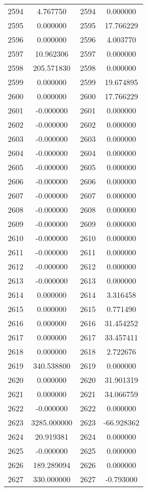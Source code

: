 \documentclass[12pt]{article}
\begin{document}
\begin{longtable}{@{}cccc@{}}
2594 & 4.767750 & 2594 & 0.000000 \\
2595 & 0.000000 & 2595 & 17.766229 \\
2596 & 0.000000 & 2596 & 4.003770 \\
2597 & 10.962306 & 2597 & 0.000000 \\
2598 & 205.571830 & 2598 & 0.000000 \\
2599 & 0.000000 & 2599 & 19.674895 \\
2600 & 0.000000 & 2600 & 17.766229 \\
2601 & -0.000000 & 2601 & 0.000000 \\
2602 & -0.000000 & 2602 & 0.000000 \\
2603 & -0.000000 & 2603 & 0.000000 \\
2604 & -0.000000 & 2604 & 0.000000 \\
2605 & -0.000000 & 2605 & 0.000000 \\
2606 & -0.000000 & 2606 & 0.000000 \\
2607 & -0.000000 & 2607 & 0.000000 \\
2608 & -0.000000 & 2608 & 0.000000 \\
2609 & -0.000000 & 2609 & 0.000000 \\
2610 & -0.000000 & 2610 & 0.000000 \\
2611 & -0.000000 & 2611 & 0.000000 \\
2612 & -0.000000 & 2612 & 0.000000 \\
2613 & -0.000000 & 2613 & 0.000000 \\
2614 & 0.000000 & 2614 & 3.316458 \\
2615 & 0.000000 & 2615 & 0.771490 \\
2616 & 0.000000 & 2616 & 31.454252 \\
2617 & 0.000000 & 2617 & 33.457411 \\
2618 & 0.000000 & 2618 & 2.722676 \\
2619 & 340.538800 & 2619 & 0.000000 \\
2620 & 0.000000 & 2620 & 31.901319 \\
2621 & 0.000000 & 2621 & 34.066759 \\
2622 & -0.000000 & 2622 & 0.000000 \\
2623 & 3285.000000 & 2623 & -66.928362 \\
2624 & 20.919381 & 2624 & 0.000000 \\
2625 & -0.000000 & 2625 & 0.000000 \\
2626 & 189.289094 & 2626 & 0.000000 \\
2627 & 330.000000 & 2627 & -0.793000 \\

\end{longtable}
\end{document}
